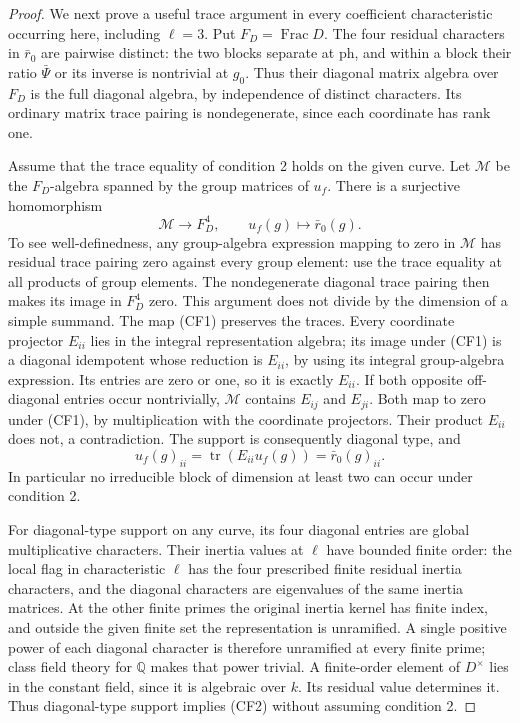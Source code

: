 \begin{proof}
We next prove a useful trace argument in every
coefficient characteristic occurring here, including
\(\ell=3\).
Put \(F_D=\operatorname{Frac}D\).
The four residual characters in \(\bar r_0\) are
pairwise distinct: the two blocks separate at
\(\mathrm{ph}\), and within a block their ratio
\(\bar\Psi\) or its inverse is nontrivial at \(g_0\).
Thus their diagonal matrix algebra over \(F_D\)
is the full diagonal algebra, by independence of
distinct characters. Its ordinary matrix trace
pairing is nondegenerate, since each coordinate
has rank one.

Assume that the trace equality of condition 2
holds on the given curve.
Let \(\mathscr M\) be the \(F_D\)-algebra spanned
by the group matrices of \(u_f\).
There is a surjective homomorphism
\[
        \mathscr M\longrightarrow F_D^4,\qquad
                 u_f(g)\longmapsto\bar r_0(g).
                                                               \tag{CF1}
\]
To see well-definedness, any group-algebra expression
mapping to zero in \(\mathscr M\) has residual trace
pairing zero against every group element: use the
trace equality at all products of group elements.
The nondegenerate diagonal trace pairing then makes
its image in \(F_D^4\) zero. This argument does not
divide by the dimension of a simple summand.
The map (CF1) preserves the traces.
Every coordinate projector \(E_{ii}\) lies in the
integral representation algebra; its image under
(CF1) is a diagonal idempotent whose reduction is
\(E_{ii}\), by using its integral group-algebra
expression. Its entries are zero or one, so it
is exactly \(E_{ii}\).
If both opposite off-diagonal entries occur
nontrivially, \(\mathscr M\) contains \(E_{ij}\)
and \(E_{ji}\). Both map to zero under (CF1), by
multiplication with the coordinate projectors.
Their product \(E_{ii}\) does not, a contradiction.
The support is consequently diagonal type, and
\[
            u_f(g)_{ii}=\operatorname{tr}(E_{ii}u_f(g))
                      =\bar r_0(g)_{ii}.                 \tag{CF2}
\]
In particular no irreducible block of dimension
at least two can occur under condition 2.

For diagonal-type support on any curve, its four
diagonal entries are global multiplicative characters.
Their inertia values at \(\ell\) have bounded finite
order: the local flag in characteristic \(\ell\)
has the four prescribed finite residual inertia
characters, and the diagonal characters are
eigenvalues of the same inertia matrices.
At the other finite primes the original inertia
kernel has finite index, and outside the given finite
set the representation is unramified.
A single positive power of each diagonal character
is therefore unramified at every finite prime;
class field theory for \(\mathbb Q\) makes that
power trivial. A finite-order element of \(D^\times\)
lies in the constant field, since it is algebraic
over \(k\). Its residual value determines it.
Thus diagonal-type support implies (CF2) without
assuming condition 2.


\end{proof}
